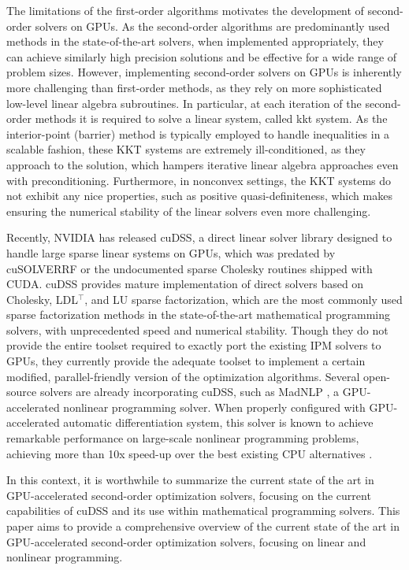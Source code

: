 \documentclass{article}
\begin{document}
The limitations of the first-order algorithms motivates the development of second-order solvers on GPUs.
As the second-order algorithms are predominantly used methods in the state-of-the-art solvers, when implemented appropriately, they can achieve similarly high precision solutions and be effective for a wide range of problem sizes.
However, implementing second-order solvers on GPUs is inherently more challenging than first-order methods, as they rely on more sophisticated low-level linear algebra subroutines.
In particular, at each iteration of the second-order methods it is required to solve a linear system, called \gls{kkt} system.
As the interior-point (barrier) method is typically employed to handle inequalities in a scalable fashion, these KKT systems are extremely ill-conditioned, as they approach to the solution, which hampers iterative linear algebra approaches even with preconditioning.
Furthermore, in nonconvex settings, the KKT systems do not exhibit any nice properties, such as positive quasi-definiteness, which makes ensuring the numerical stability of the linear solvers even more challenging.

Recently, NVIDIA has released cuDSS, a direct linear solver library designed to handle large sparse linear systems on GPUs, which was predated by cuSOLVERRF or the undocumented sparse Cholesky routines shipped with CUDA.
cuDSS provides mature implementation of direct solvers based on Cholesky, LDL$^\top$, and LU sparse factorization, which are the most commonly used sparse factorization methods in the state-of-the-art mathematical programming solvers, with unprecedented speed and numerical stability.
Though they do not provide the entire toolset required to exactly port the existing IPM solvers to GPUs, they currently provide the adequate toolset to implement a certain modified, parallel-friendly version of the optimization algorithms.
Several open-source solvers are already incorporating cuDSS, such as MadNLP \cite{}, a GPU-accelerated nonlinear programming solver.
When properly configured with GPU-accelerated automatic differentiation system, this solver is known to achieve remarkable performance on large-scale nonlinear programming problems, achieving more than 10x speed-up over the best existing CPU alternatives \cite{}.

In this context, it is worthwhile to summarize the current state of the art in GPU-accelerated second-order optimization solvers, focusing on the current capabilities of cuDSS and its use within mathematical programming solvers.
This paper aims to provide a comprehensive overview of the current state of the art in GPU-accelerated second-order optimization solvers, focusing on linear and nonlinear programming.
\end{document}

